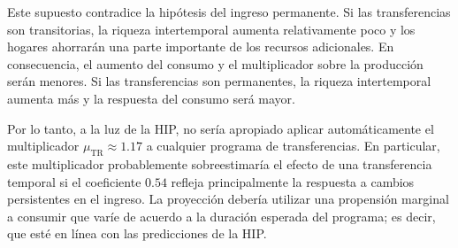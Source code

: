 \documentclass[11pt]{article}
\begin{document}
Este supuesto contradice la hipótesis del ingreso permanente. Si las transferencias son transitorias, la riqueza intertemporal aumenta relativamente poco y los hogares ahorrarán una parte importante de los recursos adicionales. En consecuencia, el aumento del consumo y el multiplicador sobre la producción serán menores. Si las transferencias son permanentes, la riqueza intertemporal aumenta más y la respuesta del consumo será mayor.

Por lo tanto, a la luz de la HIP, no sería apropiado aplicar automáticamente el multiplicador $\mu_{\mathrm{TR}} \approx 1.17$ a cualquier programa de transferencias. En particular, este multiplicador probablemente sobreestimaría el efecto de una transferencia temporal si el coeficiente \(0.54\) refleja principalmente la respuesta a cambios persistentes en el ingreso. La proyección debería utilizar una propensión marginal a consumir que varíe de acuerdo a la duración esperada del programa; es decir, que esté en línea con las predicciones de la HIP.
\end{document}
